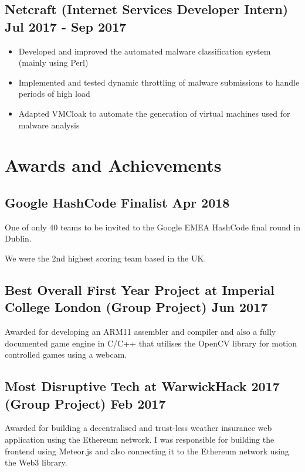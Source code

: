 \documentclass[a4paper]{article}
\begin{document}
\subsection*{Netcraft \textnormal{(Internet Services Developer Intern)} \hfill Jul 2017 - Sep 2017}

\begin{itemize}
    \item Developed and improved the automated malware classification system (mainly using Perl)
    \item Implemented and tested dynamic throttling of malware submissions to handle periods of high load
    \item Adapted VMCloak to automate the generation of virtual machines used for malware analysis
\end{itemize}

\section*{Awards and Achievements}

\subsection*{Google HashCode Finalist \hfill Apr 2018}

One of only 40 teams to be invited to the Google EMEA HashCode final round in Dublin.

We were the 2nd highest scoring team based in the UK.

\subsection*{Best Overall First Year Project at Imperial College London \textnormal{(Group Project)} \hfill Jun 2017}

Awarded for developing an ARM11 assembler and compiler and also a fully documented game engine in C/C++ that utilises the OpenCV library for motion controlled games using a webcam.

\subsection*{Most Disruptive Tech at WarwickHack 2017 \textnormal{(Group Project)} \hfill Feb 2017}

Awarded for building a decentralised and trust-less weather insurance web application using the Ethereum network. I was responsible for building the frontend using Meteor.js and also connecting it to the Ethereum network using the Web3 library.
\end{document}

